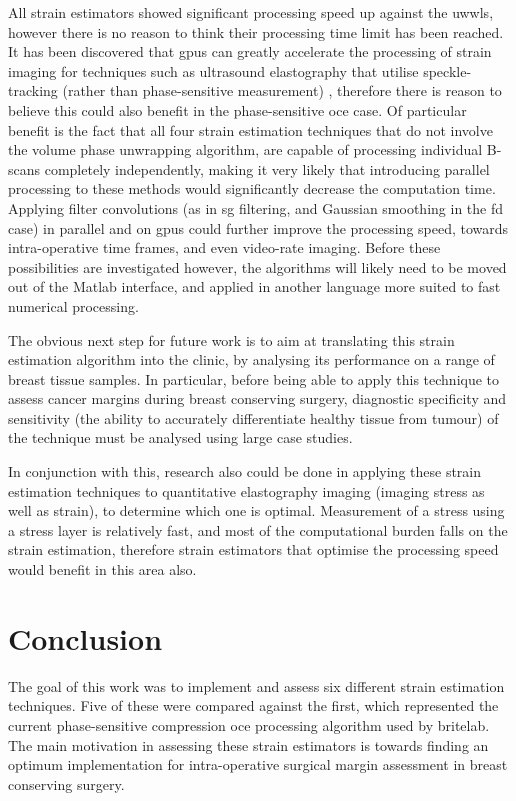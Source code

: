 All strain estimators showed significant processing speed up against the \ac{uwwls}, however there is no reason to think their processing time limit has been reached. It has been discovered that \ac{gpu}s can greatly accelerate the processing of strain imaging for techniques such as ultrasound elastography that utilise speckle-tracking (rather than phase-sensitive measurement) \cite{peng_gpu-accelerated_2017}, therefore there is reason to believe this could also benefit in the phase-sensitive \ac{oce} case. Of particular benefit is the fact that all four strain estimation techniques that do not involve the volume phase unwrapping algorithm, are capable of processing individual B-scans completely independently, making it very likely that introducing parallel processing to these methods would significantly decrease the computation time. Applying filter convolutions (as in \ac{sg} filtering, and Gaussian smoothing in the \ac{fd} case) in parallel and on \ac{gpu}s could further improve the processing speed, towards intra-operative time frames, and even video-rate imaging. Before these possibilities are investigated however, the algorithms will likely need to be moved out of the Matlab interface, and applied in another language more suited to fast numerical processing.

The obvious next step for future work is to aim at translating this strain estimation algorithm into the clinic, by analysing its performance on a range of breast tissue samples. In particular, before being able to apply this technique to assess cancer margins during breast conserving surgery, diagnostic specificity and sensitivity (the ability to accurately differentiate healthy tissue from tumour) of the technique must be analysed using large case studies.

In conjunction with this, research also could be done in applying these strain estimation techniques to quantitative elastography imaging (imaging stress as well as strain), to determine which one is optimal. Measurement of a stress using a stress layer is relatively fast, and most of the computational burden falls on the strain estimation, therefore strain estimators that optimise the processing speed would benefit in this area also. 

\section{Conclusion}

The goal of this work was to implement and assess six different strain estimation techniques. Five of these were compared against the first, which represented the current phase-sensitive compression \ac{oce} processing algorithm used by \ac{britelab}. The main motivation in assessing these strain estimators is towards finding an optimum implementation for intra-operative surgical margin assessment in breast conserving surgery. 

